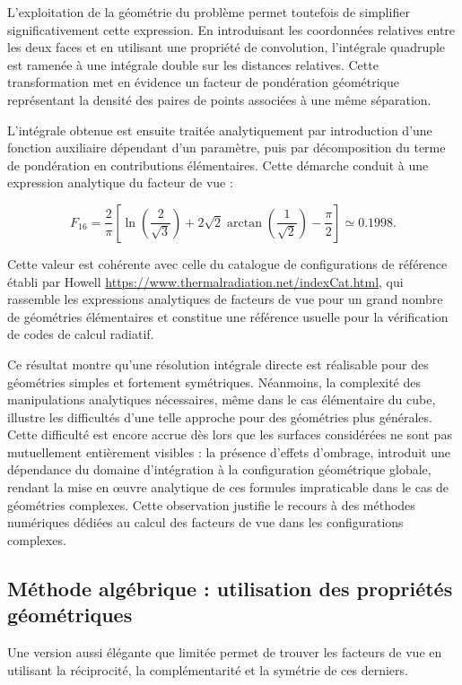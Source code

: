 L'exploitation de la géométrie du problème permet toutefois de simplifier significativement cette expression. En introduisant les coordonnées relatives entre les deux faces et en utilisant une propriété de convolution, l'intégrale quadruple est ramenée à une intégrale double sur les distances relatives. Cette transformation met en évidence un facteur de pondération géométrique représentant la densité des paires de points associées à une même séparation.

L'intégrale obtenue est ensuite traitée analytiquement par introduction d'une fonction auxiliaire dépendant d'un paramètre, puis par décomposition du terme de pondération en contributions élémentaires. Cette démarche conduit à une expression analytique du facteur de vue :

\begin{equation}
F_{16}=\frac{2}{\pi} \left[ \ln\left(\frac{2}{\sqrt{3}}\right) +2\sqrt{2}\arctan\left(\frac{1}{\sqrt{2}}\right)-\frac{\pi}{2} \right] \simeq 0.1998.
\end{equation}


Cette valeur est cohérente avec celle du catalogue de configurations de référence établi par Howell \cite{howell} \url{https://www.thermalradiation.net/indexCat.html}, qui rassemble les expressions analytiques de facteurs de vue pour un grand nombre de géométries élémentaires et constitue une référence usuelle pour la vérification de codes de calcul radiatif.

Ce résultat montre qu'une résolution intégrale directe est réalisable pour des géométries simples et fortement symétriques. Néanmoins, la complexité des manipulations analytiques nécessaires, même dans le cas élémentaire du cube, illustre les difficultés d'une telle approche pour des géométries plus générales. Cette difficulté est encore accrue dès lors que les surfaces considérées ne sont pas mutuellement entièrement visibles : la présence d'effets d'ombrage, introduit une dépendance du domaine d'intégration à la configuration géométrique globale, rendant la mise en œuvre analytique de ces formules impraticable dans le cas de géométries complexes. Cette observation justifie le recours à des méthodes numériques dédiées au calcul des facteurs de vue dans les configurations complexes.

\subsection{Méthode algébrique : utilisation des propriétés géométriques}
\label{part:calcul_anal}
Une version aussi élégante que limitée permet de trouver les facteurs de vue en utilisant la réciprocité, la complémentarité et la symétrie de ces derniers.
